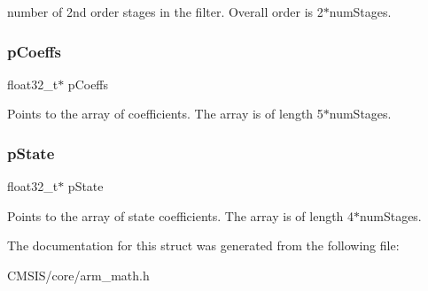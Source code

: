 number of 2nd order stages in the filter. Overall order is 2$\ast$num\+Stages. \mbox{\label{structarm__biquad__casd__df1__inst__f32_aacbb8dd8eeba4b21fc2bb40076405ee3}} 
\subsubsection{\texorpdfstring{p\+Coeffs}{pCoeffs}}
{\footnotesize\ttfamily float32\+\_\+t$\ast$ p\+Coeffs}

Points to the array of coefficients. The array is of length 5$\ast$num\+Stages. \mbox{\label{structarm__biquad__casd__df1__inst__f32_a335c87e6fdc4b96601d95a5de8b9c463}} 
\subsubsection{\texorpdfstring{p\+State}{pState}}
{\footnotesize\ttfamily float32\+\_\+t$\ast$ p\+State}

Points to the array of state coefficients. The array is of length 4$\ast$num\+Stages. 

The documentation for this struct was generated from the following file\+:\begin{DoxyCompactItemize}
\item 
C\+M\+S\+I\+S/core/arm\+\_\+math.\+h\end{DoxyCompactItemize}
